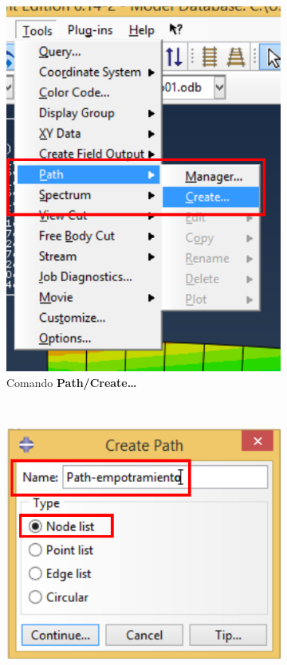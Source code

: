 \begin{enumerate}
\begin{figure}[H]
\begin{subfigure}{0.30\textwidth}
     \includegraphics[width=\textwidth]{./body/images/imagen99.pdf}
     \caption{Comando \textbf{Path/Create\ldots}}
     \label{figu99}
   \end{subfigure}%
   ~ %
   \begin{subfigure}{0.39\textwidth}
     \includegraphics[width=\textwidth]{./body/images/imagen100.pdf}

\end{subfigure}
\end{figure}
\end{enumerate}
